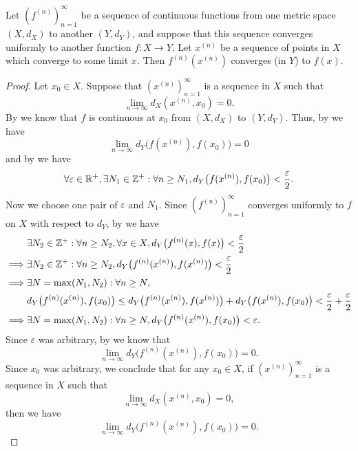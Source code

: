 \begin{prop}\label{ii:3.3.4}
  Let \((f^{(n)})_{n = 1}^\infty\) be a sequence of continuous functions from one metric space \((X, d_X)\) to another \((Y, d_Y)\), and suppose that this sequence converges uniformly to another function \(f : X \to Y\).
  Let \(x^{(n)}\) be a sequence of points in \(X\) which converge to some limit \(x\).
  Then \(f^{(n)}(x^{(n)})\) converges (in \(Y\)) to \(f(x)\).
\end{prop}

\begin{proof}
  Let \(x_0 \in X\).
  Suppose that \((x^{(n)})_{n = 1}^\infty\) is a sequence in \(X\) such that
  \[
    \lim_{n \to \infty} d_X(x^{(n)}, x_0) = 0.
  \]
  By  we know that \(f\) is continuous at \(x_0\) from \((X, d_X)\) to \((Y, d_Y)\).
  Thus, by  we have
  \[
    \lim_{n \to \infty} d_Y\big(f(x^{(n)}), f(x_0)\big) = 0
  \]
  and by  we have
  \[
    \forall \varepsilon \in \mathbb{R}^+, \exists N_1 \in \mathbb{Z}^+ : \forall n \geq N_1, d_Y\big(f(x^{(n)}), f(x_0)\big) < \dfrac{\varepsilon}{2}.
  \]
  Now we choose one pair of \(\varepsilon\) and \(N_1\).
  Since \((f^{(n)})_{n = 1}^\infty\) converges uniformly to \(f\) on \(X\) with respect to \(d_Y\), by  we have
  \begin{align*}
             & \exists N_2 \in \mathbb{Z}^+ : \forall n \geq N_2, \forall x \in X, d_Y\big(f^{(n)}(x), f(x)\big) < \dfrac{\varepsilon}{2}                                                       \\
    \implies & \exists N_2 \in \mathbb{Z}^+ : \forall n \geq N_2, d_Y\big(f^{(n)}(x^{(n)}), f(x^{(n)})\big) < \dfrac{\varepsilon}{2}                                                            \\
    \implies & \exists N = \max(N_1, N_2) : \forall n \geq N,                                                                                                                           \\
             & d_Y\big(f^{(n)}(x^{(n)}), f(x_0)\big) \leq d_Y\big(f^{(n)}(x^{(n)}), f(x^{(n)})\big) + d_Y\big(f(x^{(n)}), f(x_0)\big) < \dfrac{\varepsilon}{2} + \dfrac{\varepsilon}{2} \\
    \implies & \exists N = \max(N_1, N_2) : \forall n \geq N, d_Y\big(f^{(n)}(x^{(n)}), f(x_0)\big) < \varepsilon.
  \end{align*}
  Since \(\varepsilon\) was arbitrary, by  we know that
  \[
    \lim_{n \to \infty} d_Y\big(f^{(n)}(x^{(n)}), f(x_0)\big) = 0.
  \]
  Since \(x_0\) was arbitrary, we conclude that for any \(x_0 \in X\), if \((x^{(n)})_{n = 1}^\infty\) is a sequence in \(X\) such that
  \[
    \lim_{n \to \infty} d_X(x^{(n)}, x_0) = 0,
  \]
  then we have
  \[
    \lim_{n \to \infty} d_Y\big(f^{(n)}(x^{(n)}), f(x_0)\big) = 0.
  \]
\end{proof}

